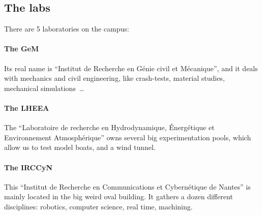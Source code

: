 \subsection{The labs}
There are 5 laboratories on the campus:
\paragraph{The GeM} Its real name is “Institut de Recherche en Génie civil et Mécanique”, and it deals with mechanics and civil engineering, like crash-tests, material studies, mechanical simulations~\dots %
\paragraph{The LHEEA} The “Laboratoire de recherche en Hydrodynamique, Énergétique et Environnement Atmosphérique” owns several big experimentation pools, which allow us to test model boats, and a wind tunnel. %
\paragraph{The IRCCyN} This “Institut de Recherche en Communications et Cybernétique de Nantes” is mainly located in the big weird oval building. It gathers a dozen different disciplines: robotics, computer science, real time, machining. %
